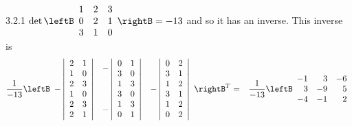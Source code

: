 \begin{Answer}{3.2.1}
$\det
\leftB
\begin{array}{ccc}
1 & 2 & 3 \\
0 & 2 & 1 \\
3 & 1 & 0
\end{array}
\rightB = -13$ and so it has an inverse. This inverse is
\begin{eqnarray*}
\frac{1}{-13}\leftB
\begin{array}{rrr}
\left\vert
\begin{array}{cc}
2 & 1 \\
1 & 0
\end{array}
\right\vert  & -\left\vert
\begin{array}{cc}
0 & 1 \\
3 & 0
\end{array}
\right\vert  & \left\vert
\begin{array}{cc}
0 & 2 \\
3 & 1
\end{array}
\right\vert  \\
-\left\vert
\begin{array}{cc}
2 & 3 \\
1 & 0
\end{array}
\right\vert  & \left\vert
\begin{array}{cc}
1 & 3 \\
3 & 0
\end{array}
\right\vert  & -\left\vert
\begin{array}{cc}
1 & 2 \\
3 & 1
\end{array}
\right\vert  \\
\left\vert
\begin{array}{cc}
2 & 3 \\
2 & 1
\end{array}
\right\vert  & -\left\vert
\begin{array}{cc}
1 & 3 \\
0 & 1
\end{array}
\right\vert  & \left\vert
\begin{array}{cc}
1 & 2 \\
0 & 2
\end{array}
\right\vert
\end{array}
\rightB ^{T} &=&\frac{1}{-13}\leftB
\begin{array}{rrr}
-1 & 3 & -6 \\
3 & -9 & 5 \\
-4 & -1 & 2
\end{array}

\end{eqnarray*}
\end{Answer}
